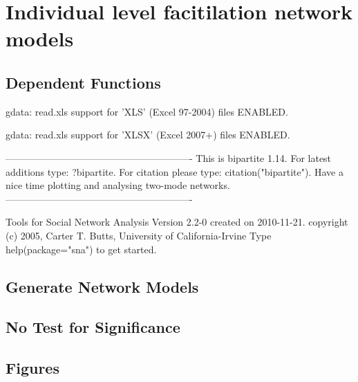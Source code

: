 \documentclass[12pt]{article}
\begin{document}

\section{Individual level facitilation network models}



\subsection{Dependent Functions}

\begin{Schunk}
\begin{Soutput}
gdata: read.xls support for 'XLS' (Excel 97-2004) files ENABLED.

gdata: read.xls support for 'XLSX' (Excel 2007+) files ENABLED.
\end{Soutput}
\begin{Soutput}
----------------------------------------------------------
This is bipartite 1.14. 
For latest additions type: ?bipartite.
For citation please type: citation("bipartite").
Have a nice time plotting and analysing two-mode networks.
----------------------------------------------------------
\end{Soutput}
\begin{Soutput}
     Tools for Social Network Analysis
Version      2.2-0 created on      2010-11-21.
copyright (c) 2005, Carter T. Butts, University of California-Irvine
Type help(package="sna") to get started.
\end{Soutput}
\end{Schunk}

\subsection{Generate Network Models}

\subsection*{No Test for Significance}


\subsection{Figures}
\end{document}
